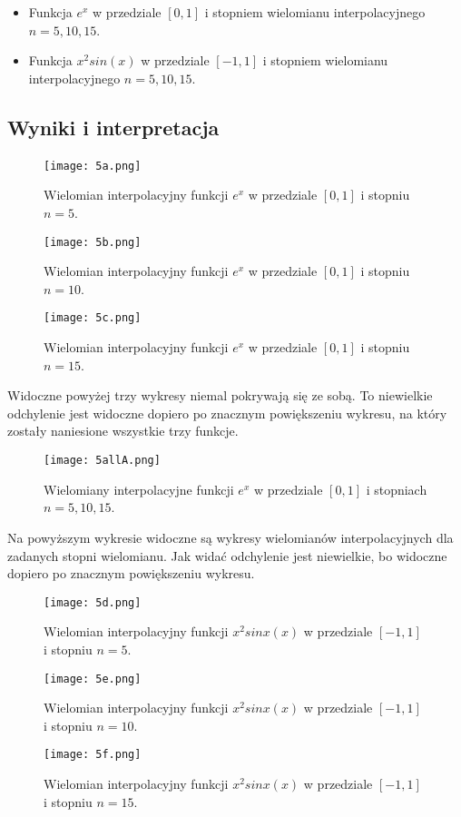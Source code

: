 \documentclass[a4paper]{article}
\theoremstyle{plain}
\begin{document}
\begin{center}
\begin{itemize}
\item	Funkcja $e^x$ w przedziale $[0, 1]$ i stopniem wielomianu interpolacyjnego $n = 5, 10, 15$.
\item	Funkcja $x^2sin(x)$ w przedziale $[-1, 1]$ i stopniem wielomianu interpolacyjnego $n = 5, 10, 15$.
\end{itemize}
\end{center}
\clearpage

\subsection{Wyniki i interpretacja}
\paragraph{}

\begin{figure}[!htb]
  \texttt{[image: 5a.png]}
  \caption{Wielomian interpolacyjny funkcji $e^x$ w przedziale $[0, 1]$ i stopniu $n = 5$.}
\endminipage\hfill
{}
  \texttt{[image: 5b.png]}
  \caption{Wielomian interpolacyjny funkcji $e^x$ w przedziale $[0, 1]$ i stopniu $n = 10$.}
\endminipage\hfill
{}%
  \texttt{[image: 5c.png]}
  \caption{Wielomian interpolacyjny funkcji $e^x$ w przedziale $[0, 1]$ i stopniu $n = 15$.}
\endminipage
\end{figure}

Widoczne powyżej trzy wykresy niemal pokrywają się ze sobą. To niewielkie odchylenie jest widoczne dopiero po znacznym powiększeniu wykresu, na który zostały naniesione wszystkie trzy funkcje.

\begin{figure}[htbp]
  \centering
  \texttt{[image: 5allA.png]}
  \caption{Wielomiany interpolacyjne funkcji $e^x$ w przedziale $[0, 1]$ i stopniach $n = 5, 10, 15$.}
\end{figure}

Na powyższym wykresie widoczne są wykresy wielomianów interpolacyjnych dla zadanych stopni wielomianu. Jak widać odchylenie jest niewielkie, bo widoczne dopiero po znacznym powiększeniu wykresu.

\begin{figure}[!htb]
  \texttt{[image: 5d.png]}
  \caption{Wielomian interpolacyjny funkcji $x^2sinx(x)$ w przedziale $[-1, 1]$ i stopniu $n = 5$.}
\endminipage\hfill
{}
  \texttt{[image: 5e.png]}
  \caption{Wielomian interpolacyjny funkcji $x^2sinx(x)$ w przedziale $[-1, 1]$ i stopniu $n = 10$.}
\endminipage\hfill
{}%
  \texttt{[image: 5f.png]}
  \caption{Wielomian interpolacyjny funkcji $x^2sinx(x)$ w przedziale $[-1, 1]$ i stopniu $n = 15$.}
\endminipage
\end{figure}
\end{document}
